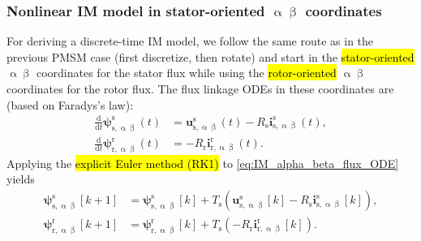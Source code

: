 \begin{frame}
    \frametitle{Nonlinear IM model in stator-oriented $\upalpha\upbeta$ coordinates}
    For deriving a discrete-time IM model, we follow the same route as in the previous PMSM case (first discretize, then rotate) and start in the \hl{stator-oriented} $\upalpha\upbeta$ coordinates for the stator flux while using the \hl{rotor-oriented} $\upalpha\upbeta$ coordinates for the rotor flux. The flux linkage ODEs in these coordinates are (based on Faradys's law):
    \begin{equation}
        \begin{split}
            \frac{\mathrm{d}}{\mathrm{d}t}\bm{\psi}^{\mathrm{s}}_\mathrm{s,\upalpha\upbeta}(t)
             & = \bm{u}^{\mathrm{s}}_\mathrm{s,\upalpha\upbeta}(t)-R_\mathrm{s}\bm{i}^{\mathrm{s}}_\mathrm{s,\upalpha\upbeta}(t), \\
            \frac{\mathrm{d}}{\mathrm{d}t}\bm{\psi}^{\mathrm{r}}_\mathrm{r,\upalpha\upbeta}(t)
             & = -R_\mathrm{r}\bm{i}^{\mathrm{r}}_\mathrm{r,\upalpha\upbeta}(t).
        \end{split}
        \label{eq:IM_alpha_beta_flux_ODE}
    \end{equation}\pause%
    Applying the \hl{explicit Euler method (RK1)} to \eqref{eq:IM_alpha_beta_flux_ODE} yields
    \begin{equation}
        \begin{split}
            \bm{\psi}^{\mathrm{s}}_\mathrm{s,\upalpha\upbeta}[k+1]
             & =\bm{\psi}^{\mathrm{s}}_\mathrm{s,\upalpha\upbeta}[k]
            +T_\mathrm{s}\left(\bm{u}^{\mathrm{s}}_\mathrm{s,\upalpha\upbeta}[k]-R_\mathrm{s}\bm{i}^{\mathrm{s}}_\mathrm{s,\upalpha\upbeta}[k]\right), \\
            \bm{\psi}^{\mathrm{r}}_\mathrm{r,\upalpha\upbeta}[k+1]
             & =\bm{\psi}^{\mathrm{r}}_\mathrm{r,\upalpha\upbeta}[k]
            +T_\mathrm{s}\left(-R_\mathrm{r}\bm{i}^{\mathrm{r}}_\mathrm{r,\upalpha\upbeta}[k]
            \right).
        \end{split}
        \label{eq:RK1_alpha_beta_flux_linkage_IM}
    \end{equation}
\end{frame}


